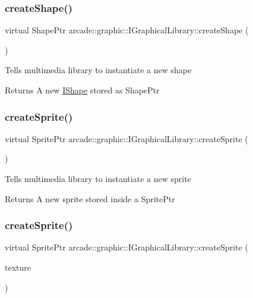 \subsubsection{\texorpdfstring{createShape()}{createShape()}}
{\footnotesize\ttfamily virtual Shape\+Ptr arcade\+::graphic\+::\+I\+Graphical\+Library\+::create\+Shape (\begin{DoxyParamCaption}{ }\end{DoxyParamCaption})\hspace{0.3cm}{\ttfamily [pure virtual]}}

Tells multimedia library to instantiate a new shape \begin{DoxyReturn}{Returns}
A new \mbox{\hyperlink{classarcade_1_1graphic_1_1_i_shape}{I\+Shape}} stored as Shape\+Ptr 
\end{DoxyReturn}
\mbox{\label{classarcade_1_1graphic_1_1_i_graphical_library_a5701fd02a99c9943972abe2bef53de39}} 
\subsubsection{\texorpdfstring{createSprite()}{createSprite()}\hspace{0.1cm}{\footnotesize\ttfamily [1/2]}}
{\footnotesize\ttfamily virtual Sprite\+Ptr arcade\+::graphic\+::\+I\+Graphical\+Library\+::create\+Sprite (\begin{DoxyParamCaption}{ }\end{DoxyParamCaption})\hspace{0.3cm}{\ttfamily [pure virtual]}}

Tells multimedia library to instantiate a new sprite \begin{DoxyReturn}{Returns}
A new sprite stored inside a Sprite\+Ptr 
\end{DoxyReturn}
\mbox{\label{classarcade_1_1graphic_1_1_i_graphical_library_a22d325c6237cae0543d58e321de675f6}} 
\subsubsection{\texorpdfstring{createSprite()}{createSprite()}\hspace{0.1cm}{\footnotesize\ttfamily [2/2]}}
{\footnotesize\ttfamily virtual Sprite\+Ptr arcade\+::graphic\+::\+I\+Graphical\+Library\+::create\+Sprite (\begin{DoxyParamCaption}\item[{Texture\+Ptr}]{texture }\end{DoxyParamCaption})\hspace{0.3cm}{\ttfamily [pure virtual]}}

